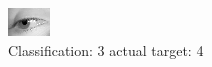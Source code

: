 \begin{figure}[h!]
\begin{center}
\includegraphics[width=0.60\columnwidth]{figures/ID2946_class_3_target_4.png}
\end{center}
\caption{ Classification: 3 actual target: 4}
\label{fig:ID2946_class_3_target_4}
\end{figure}
